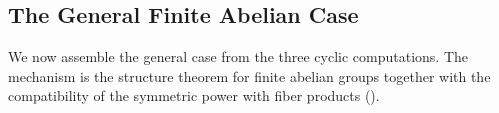 \subsection{The General Finite Abelian Case}\label{subsection:general_abelian_case}

We now assemble the general case from the three cyclic computations. The
mechanism is the structure theorem for finite abelian groups together with the
compatibility of the symmetric power with fiber products
().

